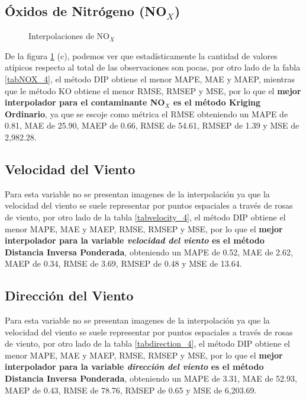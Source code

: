 \subsection{Óxidos de Nitrógeno (NO$_{X}$)}
\begin{figure}[h]
\centering
{}
\caption{Interpolaciones de NO$_{X}$}
\label{final_9}
\end{figure}

De la figura \ref{final_9} (c), podemos ver que estadísticamente la cantidad de valores atípicos respecto al total de las observaciones son pocas, por otro lado de la fabla \ref{tabNOX_4}, el método DIP obtiene el menor MAPE, MAE y MAEP, mientras que le método KO obtiene el menor RMSE, RMSEP y MSE, por lo que el \textbf{mejor interpolador para el contaminante NO$_{X}$ es el método Kriging Ordinario}, ya que se escoje como métrica el RMSE obteniendo un MAPE de 0.81, MAE de 25.90, MAEP de 0.66, RMSE de 54.61, RMSEP de 1.39 y MSE de 2,982.28.

\subsection{Velocidad del Viento}
Para esta variable no se presentan imagenes de la interpolación ya que la velocidad del viento se suele representar por puntos espaciales a través de rosas de viento, por otro lado de la tabla \ref{tabvelocity_4}, el método DIP obtiene el menor MAPE, MAE y MAEP, RMSE, RMSEP y MSE, por lo que el \textbf{mejor interpolador para la variable {\em velocidad del viento} es el método Distancia Inversa Ponderada}, obteniendo un MAPE de 0.52, MAE de 2.62, MAEP de 0.34, RMSE de 3.69, RMSEP de 0.48 y MSE de 13.64.

\subsection{Dirección del Viento}
Para esta variable no se presentan imagenes de la interpolación ya que la velocidad del viento se suele representar por puntos espaciales a través de rosas de viento, por otro lado de la tabla \ref{tabdirection_4}, el método DIP obtiene el menor MAPE, MAE y MAEP, RMSE, RMSEP y MSE, por lo que el \textbf{mejor interpolador para la variable {\em dirección del viento} es el método Distancia Inversa Ponderada}, obteniendo un MAPE de 3.31, MAE de 52.93, MAEP de 0.43, RMSE de 78.76, RMSEP de 0.65 y MSE de 6,203.69.

